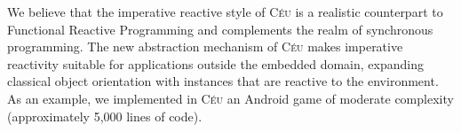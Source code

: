 \documentclass[11pt,a4paper]{article}
\newcommand{\CEU}{\textsc{C\'{e}u}\xspace}
\begin{document}
We believe that the imperative reactive style of \CEU is a realistic 
counterpart to Functional Reactive Programming and complements the realm of 
synchronous programming.
%
The new abstraction mechanism of \CEU makes imperative reactivity suitable for 
applications outside the embedded domain, expanding classical object 
orientation with instances that are reactive to the environment.
%
As an example, we implemented in \CEU an Android game of moderate complexity 
(approximately 5,000 lines of code).

\begin{comment}
programs close to specification

adv: convenience of imperative w/o the burden
also solves the callback hell
- big gap for imperative reactivity

React (vs FRP)
http://www.debjitbiswas.com/genuinely-functional-user-interfaces-and-react/
\end{comment}

%
%
%
%
\end{document}
